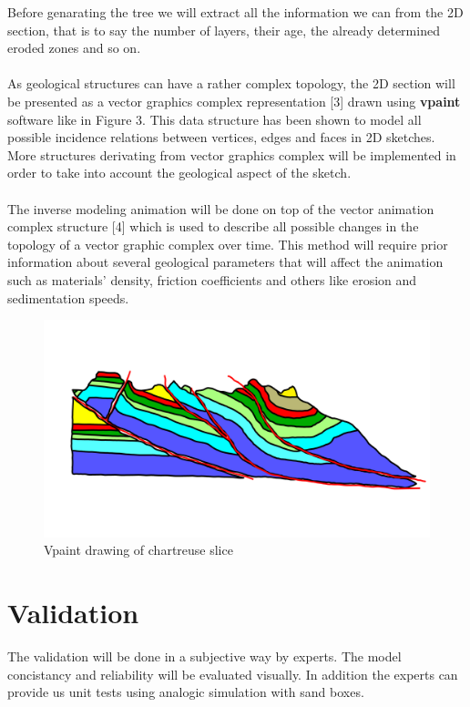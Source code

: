 \documentclass[a4paper,11pt]{article}
\begin{document}
Before genarating the tree we will extract all the information we can from the 2D section, that is to say the number of layers, their age, the already determined eroded zones and so on.\\\\
As geological structures can have a rather complex topology, the 2D section will be presented as a vector graphics complex representation [3] drawn using \textbf{vpaint} software like in Figure 3. This data structure has been shown to model all possible incidence relations between vertices, edges and faces in 2D sketches. More structures derivating from vector graphics complex will be implemented in order to take into account the geological aspect of the sketch.\\\\
The inverse modeling animation will be done on top of the vector animation complex structure [4] which is used to describe all possible changes in the topology of a vector graphic complex over time.
This method will require prior information about several geological parameters that will affect the animation such as materials' density, friction coefficients and others like erosion and sedimentation speeds.


\begin{figure}[H]
\centering
\includegraphics[scale=0.5]{chartreuse_paint.png}
\caption{Vpaint drawing of chartreuse slice}
\end{figure}

\section{Validation}

The validation will be done in a subjective way by experts. The model concistancy and reliability will be evaluated visually.
In addition the experts can provide us unit tests using analogic simulation with sand boxes.
\end{document}
